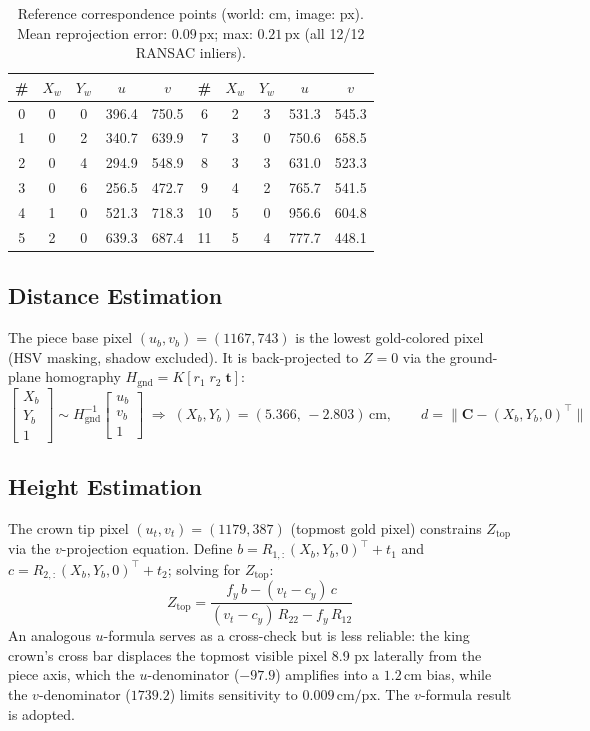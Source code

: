 \documentclass[11pt,a4paper]{article}
\begin{document}
\begin{table}[h!]
\centering\footnotesize
\setlength{\tabcolsep}{4.5pt}
\caption{Reference correspondence points (world: cm, image: px). Mean reprojection error: $0.09\,\text{px}$; max: $0.21\,\text{px}$ (all 12/12 RANSAC inliers).}
\begin{tabular}{c|cccc|c|cccc}
\toprule
\# & $X_w$ & $Y_w$ & $u$ & $v$ & \# & $X_w$ & $Y_w$ & $u$ & $v$ \\
\midrule
0 & 0 & 0 & 396.4 & 750.5 &  6 & 2 & 3 & 531.3 & 545.3 \\
1 & 0 & 2 & 340.7 & 639.9 &  7 & 3 & 0 & 750.6 & 658.5 \\
2 & 0 & 4 & 294.9 & 548.9 &  8 & 3 & 3 & 631.0 & 523.3 \\
3 & 0 & 6 & 256.5 & 472.7 &  9 & 4 & 2 & 765.7 & 541.5 \\
4 & 1 & 0 & 521.3 & 718.3 & 10 & 5 & 0 & 956.6 & 604.8 \\
5 & 2 & 0 & 639.3 & 687.4 & 11 & 5 & 4 & 777.7 & 448.1 \\
\bottomrule
\end{tabular}
\end{table}

\subsection{Distance Estimation}

The piece base pixel $(u_b,v_b)=(1167,743)$ is the lowest gold-colored pixel (HSV masking, shadow excluded). It is back-projected to $Z=0$ via the ground-plane homography $H_\text{gnd}=K[r_1\;r_2\;\mathbf{t}]$:
\[
  \begin{bmatrix}X_b\\Y_b\\1\end{bmatrix}\sim H_\text{gnd}^{-1}\begin{bmatrix}u_b\\v_b\\1\end{bmatrix}
  \;\Rightarrow\;(X_b,Y_b)=(5.366,\,-2.803)\,\text{cm},
  \qquad d=\|\mathbf{C}-(X_b,Y_b,0)^\top\|
\]

\subsection{Height Estimation}

The crown tip pixel $(u_t,v_t)=(1179,387)$ (topmost gold pixel) constrains $Z_\text{top}$ via the $v$-projection equation. Define $b=R_{1,:}(X_b,Y_b,0)^\top+t_1$ and $c=R_{2,:}(X_b,Y_b,0)^\top+t_2$; solving for $Z_\text{top}$:
\[
  \boxed{Z_\text{top}=\frac{f_y\,b-(v_t-c_y)\,c}{(v_t-c_y)\,R_{22}-f_y\,R_{12}}}
\]
An analogous $u$-formula serves as a cross-check but is less reliable: the king crown's cross bar displaces the topmost visible pixel 8.9 px laterally from the piece axis, which the $u$-denominator ($-97.9$) amplifies into a $1.2\,\text{cm}$ bias, while the $v$-denominator ($1739.2$) limits sensitivity to $0.009\,\text{cm/px}$. The $v$-formula result is adopted.
\end{document}
